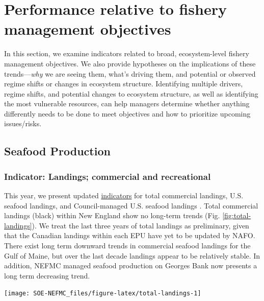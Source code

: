 \documentclass[
  10pt,
]{article}
\let\origfigure\figure
\let\endorigfigure\endfigure
\renewenvironment{figure}[1][2] {
    \expandafter\origfigure\expandafter[H]
} {
    \endorigfigure
}
\begin{document}
\hypertarget{performance-relative-to-fishery-management-objectives}{%
\section{Performance relative to fishery management objectives}\label{performance-relative-to-fishery-management-objectives}}

In this section, we examine indicators related to broad, ecosystem-level fishery management objectives. We also provide hypotheses on the implications of these trends---\emph{why} we are seeing them, what's driving them, and potential or observed regime shifts or changes in ecosystem structure. Identifying multiple drivers, regime shifts, and potential changes to ecosystem structure, as well as identifying the most vulnerable resources, can help managers determine whether anything differently needs to be done to meet objectives and how to prioritize upcoming issues/risks.

\hypertarget{seafood-production}{%
\subsection{Seafood Production}\label{seafood-production}}

\hypertarget{indicator-landings-commercial-and-recreational}{%
\subsubsection{Indicator: Landings; commercial and recreational}\label{indicator-landings-commercial-and-recreational}}

This year, we present updated \href{https://noaa-edab.github.io/catalog/commercial-landings-and-revenue.html}{indicators} for total commercial landings, U.S. seafood landings, and Council-managed U.S. seafood landings . Total commercial landings (black) within New England show no long-term trends (Fig. \ref{fig:total-landings}). We treat the last three years of total landings as preliminary, given that the Canadian landings within each EPU have yet to be updated by NAFO. There exist long term downward trends in commercial seafood landings for the Gulf of Maine, but over the last decade landings appear to be relatively stable. In addition, NEFMC managed seafood production on Georges Bank now presents a long term decreasing trend.

\begin{figure}

{\centering \texttt{[image: SOE-NEFMC\_files/figure-latex/total-landings-1]} 

}

\caption{Total commercial landings (black), total U.S. seafood landings (blue), and New England managed U.S. seafood landings (red) for Georges Bank and the Gulf of Maine. Open circles represent years that are lacking NAFO (foreign) data. mt = metric tons}\label{fig:total-landings}
\end{figure}
\end{document}

